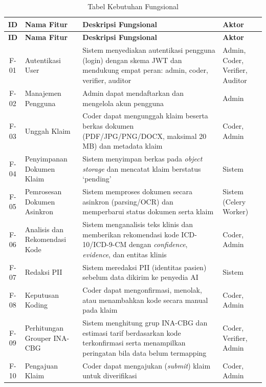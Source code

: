 \begin{small}
\begin{longtable}{|c|>{\raggedright\arraybackslash}p{2.5cm}|>{\raggedright\arraybackslash}p{6.2cm}|>{\raggedright\arraybackslash}p{2.8cm}|}
\caption{Tabel Kebutuhan Fungsional}\label{tab:kebutuhan-fungsional}\\
\hline
\textbf{ID} & \textbf{Nama Fitur} & \textbf{Deskripsi Fungsional} & \textbf{Aktor} \\
\hline
\endfirsthead
\hline
\textbf{ID} & \textbf{Nama Fitur} & \textbf{Deskripsi Fungsional} & \textbf{Aktor} \\
\hline
\endhead
\hline
\endfoot
F-01 & Autentikasi User & Sistem menyediakan autentikasi pengguna (login) dengan skema JWT dan mendukung empat peran: admin, coder, verifier, auditor & Admin, Coder, Verifier, Auditor \\ \hline
F-02 & Manajemen Pengguna & Admin dapat mendaftarkan dan mengelola akun pengguna & Admin \\ \hline
F-03 & Unggah Klaim & Coder dapat mengunggah klaim beserta berkas dokumen (PDF/JPG/PNG/DOCX, maksimal 20 MB) dan metadata klaim & Coder, Admin \\ \hline
F-04 & Penyimpanan Dokumen Klaim & Sistem menyimpan berkas pada \textit{object storage} dan mencatat klaim berstatus `pending' & Sistem \\ \hline
F-05 & Pemrosesan Dokumen Asinkron & Sistem memproses dokumen secara asinkron (parsing/OCR) dan memperbarui status dokumen serta klaim & Sistem (Celery Worker) \\ \hline
F-06 & Analisis dan Rekomendasi Kode & Sistem menganalisis teks klinis dan memberikan rekomendasi kode ICD-10/ICD-9-CM dengan \textit{confidence}, \textit{evidence}, dan entitas klinis & Coder, Admin \\ \hline
F-07 & Redaksi PII & Sistem meredaksi PII (identitas pasien) sebelum data dikirim ke penyedia AI & Sistem \\ \hline
F-08 & Keputusan Koding & Coder dapat mengonfirmasi, menolak, atau menambahkan kode secara manual pada klaim & Coder, Admin \\ \hline
F-09 & Perhitungan Grouper INA-CBG & Sistem menghitung grup INA-CBG dan estimasi tarif berdasarkan kode terkonfirmasi serta menampilkan peringatan bila data belum termapping & Coder, Verifier, Admin \\ \hline
F-10 & Pengajuan Klaim & Coder dapat mengajukan (\textit{submit}) klaim untuk diverifikasi & Coder, Admin \\ \hline

\end{longtable}
\end{small}
